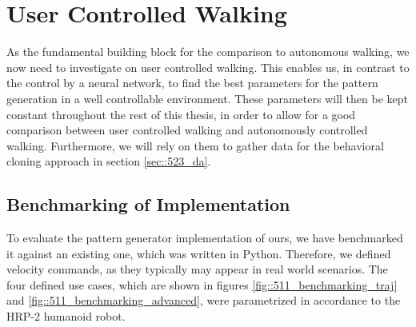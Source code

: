 \section{User Controlled Walking}
\label{sec::51_uc}
As the fundamental building block for the comparison to autonomous walking, we now need to investigate on user controlled walking. This enables us, in contrast to the control by a neural network, to find the best parameters for the pattern generation in a well controllable environment. These parameters will then be kept constant throughout the rest of this thesis, in order to allow for a good comparison between user controlled walking and autonomously controlled walking. Furthermore, we will rely on them to gather data for the behavioral cloning approach in section \ref{sec::523_da}.
\subsection{Benchmarking of Implementation}
To evaluate the pattern generator implementation of ours, we have benchmarked it against an existing one, which was written in Python. Therefore, we defined velocity commands, as they typically may appear in real world scenarios. The four defined use cases, which are shown in figures \ref{fig::511_benchmarking_traj} and \ref{fig::511_benchmarking_advanced}, were parametrized in accordance to the HRP-2 humanoid robot.
